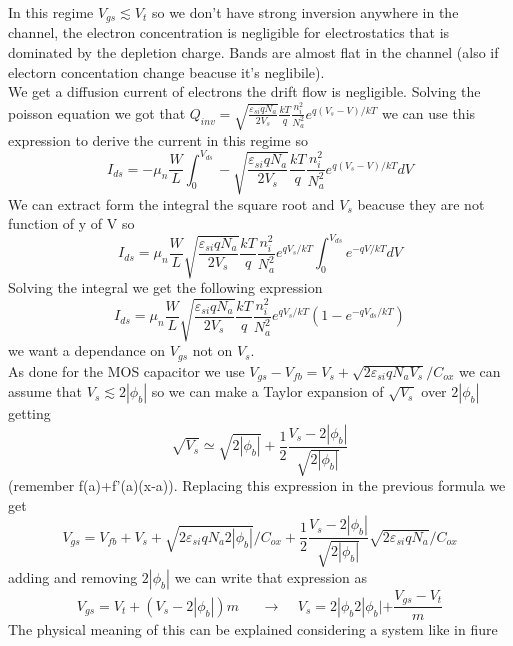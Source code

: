 In this regime $V_{gs} \lesssim V_t$ so we don't have strong inversion anywhere in the channel, the electron concentration is negligible for electrostatics that is dominated by the depletion charge. Bands are almost flat in the channel (also if electorn concentation change beacuse it's neglibile).\\
We get a diffusion current of electrons the drift flow is negligible. Solving the poisson equation we got that $Q_{inv}=\sqrt{\frac{\varepsilon_{si}qN_a}{2V_s}}\frac{kT}{q}\frac{n_i^2}{N_a^2}e^{q(V_s-V)/kT}$ we can use this expression to derive the current in this regime so 
\begin{equation}
I_{ds}=-\mu_n \frac{W}{L}\int^{V_{ds}}_0-\sqrt{\frac{\varepsilon_{si}qN_a}{2V_s}}\frac{kT}{q}\frac{n_i^2}{N_a^2}e^{q(V_s-V)/kT}dV
\end{equation}
We can extract form the integral the square root and $V_s$ beacuse they are not function of y of V so 
\begin{equation}
I_{ds}=\mu_n \frac{W}{L}\sqrt{\frac{\varepsilon_{si}qN_a}{2V_s}}\frac{kT}{q}\frac{n_i^2}{N_a^2}e^{qV_s/kT}\int^{V_{ds}}_0e^{-qV/kT}dV
\end{equation}
Solving the integral we get the following expression
\begin{equation}
I_{ds}=\mu_n \frac{W}{L}\sqrt{\frac{\varepsilon_{si}qN_a}{2V_s}}\frac{kT}{q}\frac{n_i^2}{N_a^2}e^{qV_s/kT}\left(1-e^{-qV_{ds}/kT}\right)
\end{equation}
we want a dependance on $V_{gs}$ not on $V_s$.\\
As done for the MOS capacitor we use $V_{gs}-V_{fb}=V_s+\sqrt{2\varepsilon_{si}qN_aV_s}/C_{ox}$ we can assume that $V_s \lesssim 2|\phi_b|$ so we can make a Taylor expansion of $\sqrt{V_s}$ over $2|\phi_b|$ getting 
\begin{equation}
\sqrt{V_s}\simeq \sqrt{2|\phi_b|}+\frac{1}{2}\frac{V_{s}-2|\phi_b|}{\sqrt{2|\phi_b|}}
\end{equation}
(remember f(a)+f'(a)(x-a)). Replacing this expression in the previous formula we get 
\begin{equation}
V_{gs}=V_{fb}+V_s+\sqrt{2\varepsilon_{si}qN_a2|\phi_b|}/C_{ox}+\frac{1}{2}\frac{V_{s}-2|\phi_b|}{\sqrt{2|\phi_b|}}\sqrt{2\varepsilon_{si}qN_a}/C_{ox}
\end{equation}
adding and removing $2|\phi_b|$ we can write that expression as 
\begin{equation}
V_{gs}=V_t+(V_s-2|\phi_b|)m\ \ \ \ \ \ \ \rightarrow \ \ \ \ \ V_{s}=2|\phi_b2|\phi_b|+\frac{V_{gs}-V_t}{m}
\end{equation}
The physical meaning of this can be explained considering a system like in fiure\\

